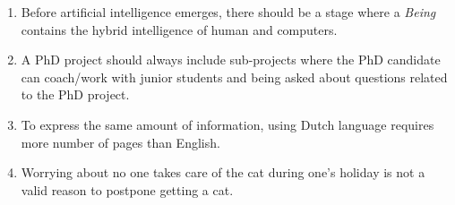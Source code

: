 \documentclass{dissertation}
\begin{document}
\begin{enumerate}
\item Before artificial intelligence emerges, there should be a stage where a \textit{Being} contains the hybrid intelligence of human and computers. 


\item A PhD project should always include sub-projects where the PhD candidate can coach/work with junior students and being asked about questions related to the PhD project. 


\item To express the same amount of information, using Dutch language requires more number of pages than English. 


\item Worrying about no one takes care of the cat during one's holiday is not a valid reason to postpone getting a cat. 



\end{enumerate}
\end{document}
